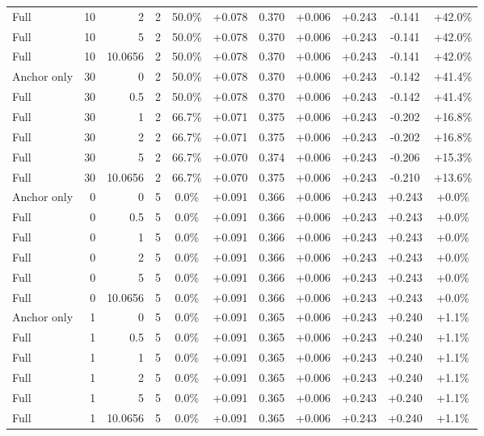 \begin{table}[htbp]
\begin{tabular}{lrrrccccccc}
Full & 10 & 2 & 2 & 50.0\% & +0.078 & 0.370 & +0.006 & +0.243 & -0.141 & +42.0\% \\
Full & 10 & 5 & 2 & 50.0\% & +0.078 & 0.370 & +0.006 & +0.243 & -0.141 & +42.0\% \\
Full & 10 & 10.0656 & 2 & 50.0\% & +0.078 & 0.370 & +0.006 & +0.243 & -0.141 & +42.0\% \\
Anchor only & 30 & 0 & 2 & 50.0\% & +0.078 & 0.370 & +0.006 & +0.243 & -0.142 & +41.4\% \\
Full & 30 & 0.5 & 2 & 50.0\% & +0.078 & 0.370 & +0.006 & +0.243 & -0.142 & +41.4\% \\
Full & 30 & 1 & 2 & 66.7\% & +0.071 & 0.375 & +0.006 & +0.243 & -0.202 & +16.8\% \\
Full & 30 & 2 & 2 & 66.7\% & +0.071 & 0.375 & +0.006 & +0.243 & -0.202 & +16.8\% \\
Full & 30 & 5 & 2 & 66.7\% & +0.070 & 0.374 & +0.006 & +0.243 & -0.206 & +15.3\% \\
Full & 30 & 10.0656 & 2 & 66.7\% & +0.070 & 0.375 & +0.006 & +0.243 & -0.210 & +13.6\% \\
Anchor only & 0 & 0 & 5 & 0.0\% & +0.091 & 0.366 & +0.006 & +0.243 & +0.243 & +0.0\% \\
Full & 0 & 0.5 & 5 & 0.0\% & +0.091 & 0.366 & +0.006 & +0.243 & +0.243 & +0.0\% \\
Full & 0 & 1 & 5 & 0.0\% & +0.091 & 0.366 & +0.006 & +0.243 & +0.243 & +0.0\% \\
Full & 0 & 2 & 5 & 0.0\% & +0.091 & 0.366 & +0.006 & +0.243 & +0.243 & +0.0\% \\
Full & 0 & 5 & 5 & 0.0\% & +0.091 & 0.366 & +0.006 & +0.243 & +0.243 & +0.0\% \\
Full & 0 & 10.0656 & 5 & 0.0\% & +0.091 & 0.366 & +0.006 & +0.243 & +0.243 & +0.0\% \\
Anchor only & 1 & 0 & 5 & 0.0\% & +0.091 & 0.365 & +0.006 & +0.243 & +0.240 & +1.1\% \\
Full & 1 & 0.5 & 5 & 0.0\% & +0.091 & 0.365 & +0.006 & +0.243 & +0.240 & +1.1\% \\
Full & 1 & 1 & 5 & 0.0\% & +0.091 & 0.365 & +0.006 & +0.243 & +0.240 & +1.1\% \\
Full & 1 & 2 & 5 & 0.0\% & +0.091 & 0.365 & +0.006 & +0.243 & +0.240 & +1.1\% \\
Full & 1 & 5 & 5 & 0.0\% & +0.091 & 0.365 & +0.006 & +0.243 & +0.240 & +1.1\% \\
Full & 1 & 10.0656 & 5 & 0.0\% & +0.091 & 0.365 & +0.006 & +0.243 & +0.240 & +1.1\% \\

\end{tabular}
\end{table}
